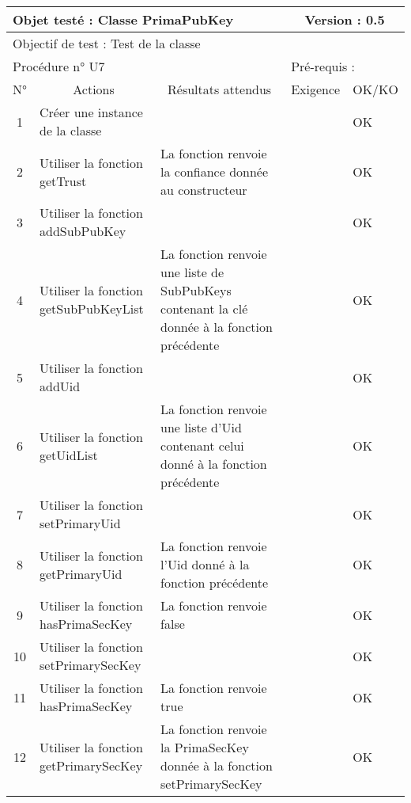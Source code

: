 \documentclass{../res/univ-projet}
\begin{document}
\begin{center}
    \begin{tabular}{|c|p{5cm}|p{5cm}|p{1.5cm}|p{1.5cm}|}
      \hline
      \multicolumn{3}{|l|}{Objet testé : Classe PrimaPubKey} & \multicolumn{2}{c|}{Version : 0.5}\\ \hline
      \multicolumn{5}{|l|}{Objectif de test : Test de la classe}\\ \hline
      \multicolumn{3}{|l|}{Procédure n° U7} & \multicolumn{2}{p{3cm}|}{Pré-requis : }\\ \hline
      \multicolumn{1}{|c|}{N°} & \multicolumn{1}{c|}{Actions} & \multicolumn{1}{c|}{Résultats attendus} & 
      \multicolumn{1}{c|}{Exigence} & \multicolumn{1}{c|}{OK/KO}\\ \hline
      1 & Créer une instance de la classe &  &  & OK \\
      2 & Utiliser la fonction getTrust & La fonction renvoie la confiance donnée au constructeur &  & OK \\
      3 & Utiliser la fonction addSubPubKey &  &  & OK \\
      4 & Utiliser la fonction getSubPubKeyList & La fonction renvoie une liste de SubPubKeys contenant la clé donnée à la fonction précédente &  & OK \\
      5 & Utiliser la fonction addUid &  &  & OK \\
      6 & Utiliser la fonction getUidList & La fonction renvoie une liste d'Uid contenant celui donné à la fonction précédente &  & OK \\
      7 & Utiliser la fonction setPrimaryUid &  &  & OK \\
      8 & Utiliser la fonction getPrimaryUid & La fonction renvoie l'Uid donné à la fonction précédente &  & OK \\
      9 & Utiliser la fonction hasPrimaSecKey & La fonction renvoie false &  & OK \\
      10 & Utiliser la fonction setPrimarySecKey &  &  & OK \\ 
      11 & Utiliser la fonction hasPrimaSecKey & La fonction renvoie true &  & OK \\ 
      12 & Utiliser la fonction getPrimarySecKey & La fonction renvoie la PrimaSecKey donnée à la fonction setPrimarySecKey &  & OK \\ 
  \hline
    \end{tabular}
    \vskip 2.2cm


\end{center}
\end{document}

